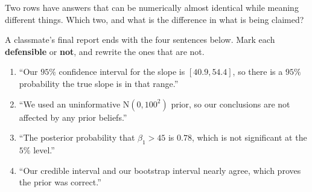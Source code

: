 \documentclass[11pt]{article}
\newcommand{\answerspace}[1]{\vspace{#1}}
\begin{document}
\begin{questions}
\begin{parts}
\item Two rows have answers that can be numerically almost identical while meaning different things.
Which two, and what is the difference in what is being claimed?
\answerspace{4.5em}

\item A classmate's final report ends with the four sentences below. Mark each \textbf{defensible} or
\textbf{not}, and rewrite the ones that are not.
\begin{enumerate}[label=\textbf{S\arabic*.}, leftmargin=2.2em, itemsep=.25em, topsep=.35em]
\item ``Our $95\%$ confidence interval for the slope is $[40.9, 54.4]$, so there is a $95\%$
probability the true slope is in that range.''
\item ``We used an uninformative N$(0, 100^2)$ prior, so our conclusions are not affected by any
prior beliefs.''
\item ``The posterior probability that $\beta_1 > 45$ is $0.78$, which is not significant at the
$5\%$ level.''
\item ``Our credible interval and our bootstrap interval nearly agree, which proves the prior was
correct.''
\end{enumerate}
\answerspace{7em}
\end{parts}

\end{questions}
\end{document}
